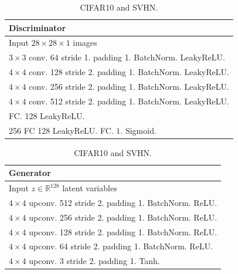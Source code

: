 \begin{table}[!t]
    \begin{subtable}[h]{\textwidth}
    \caption{CIFAR10 and SVHN.}
    \centering
        \begin{tabular}{|l|}
        \toprule
        \textbf{Discriminator}  \\
        \midrule
        Input $28\times28\times1$ images  \\
        \hline 
        $3\times3$ conv. 64 stride 1. padding 1. BatchNorm. LeakyReLU. \\
        \hline 
        $4\times4$ conv. 128 stride 2. padding 1. BatchNorm. LeakyReLU. \\
        \hline 
        $4\times4$ conv. 256 stride 2. padding 1. BatchNorm. LeakyReLU. \\
        \hline
        $4\times4$ conv. 512  stride 2. padding 1. BatchNorm. LeakyReLU.  \\
        \hline
        FC. 128 LeakyReLU. \\
        \hline
        256 FC 128 LeakyReLU. FC. $1$. Sigmoid.  \\
        \bottomrule
        \end{tabular}
    \vspace*{1ex}
    \end{subtable}
    \begin{subtable}[h]{\textwidth}
    \centering
        \begin{tabular}{|l|}
        \toprule
        \textbf{Generator} \\
        \midrule
         Input $z\in \mathbb{R}^{128}$ latent variables \\
        \hline 
        $4\times4$ upconv. 512 stride 2. padding 1. BatchNorm. ReLU. \\
        \hline 
        $4\times4$ upconv. 256 stride 2. padding 1. BatchNorm. ReLU. \\
        \hline
        $4\times4$ upconv. 128 stride 2. padding 1. BatchNorm. ReLU. \\
        \hline
        $4\times4$ upconv. 64 stride 2. padding 1. BatchNorm. ReLU. \\
        \hline
        $4\times4$ upconv. 3 \hspace{0.2em} stride 2. padding 1. Tanh. \\
        \bottomrule
        \end{tabular}
    \vspace*{1ex}
    \end{subtable}
    \begin{subtable}[h]{\textwidth}

\end{subtable}
\end{table}
